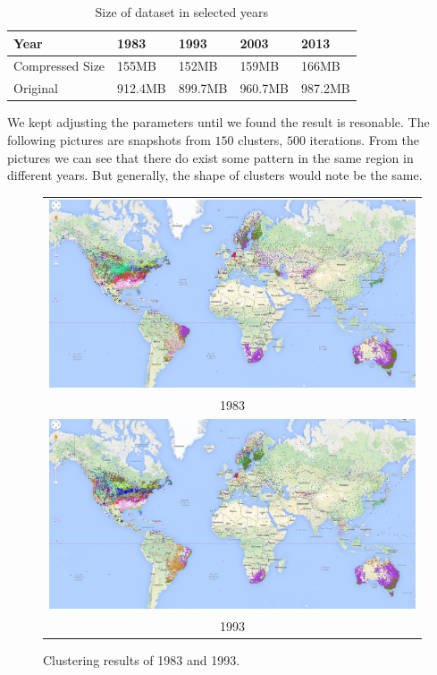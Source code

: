 \begin{table}[htbp]
    \centering
    \label{table:4year}
    \begin{tabular}{|l|l|l|l|l|}
        \hline
        Year & 1983 & 1993 & 2003 & 2013 \\
        \hline
        Compressed Size & 155MB & 152MB & 159MB & 166MB \\
        \hline
        Original & 912.4MB & 899.7MB & 960.7MB & 987.2MB \\
        \hline
    \end{tabular}
    \caption{Size of dataset in selected years}
\end{table}

We kept adjusting the parameters until we found the result is resonable. The following pictures are snapshots from $150$ clusters, $500$ iterations. From the pictures we can see that there do exist some pattern in the same region in different years. But generally, the shape of clusters would note be the same.

\begin{figure}[htbp]
    \centering
    \begin{tabular}{c}
        \includegraphics[width =\linewidth]{images/1983.png}\\1983\\
        \includegraphics[width =\linewidth]{images/1993.png}\\1993\\
    \end{tabular}
    \caption{Clustering results of 1983 and 1993.}
\end{figure}

